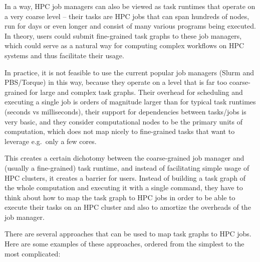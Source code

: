 In a way, HPC job managers can also be viewed as task runtimes that operate on a very coarse
level -- their tasks are HPC jobs that can span hundreds of nodes, run for days or even longer and
consist of many various programs being executed. In theory, users could submit fine-grained task
graphs to these job managers, which could serve as a natural way for computing complex workflows on
HPC systems and thus facilitate their usage.

In practice, it is not feasible to use the current popular job managers (Slurm and PBS/Torque) in
this way, because they operate on a level that is far too coarse-grained for large and complex task
graphs. Their overhead for scheduling and executing a single job is orders of magnitude larger
than for typical task runtimes (seconds vs milliseconds), their support for dependencies between
tasks/jobs is very basic, and they consider computational nodes to be the primary units of
computation, which does not map nicely to fine-grained tasks that want to leverage e.g.\ only a
few cores.

This creates a certain dichotomy between the coarse-grained job manager and (usually a
fine-grained) task runtime, and instead of facilitating simple usage of HPC clusters, it creates a
barrier for users. Instead of building a task graph of the whole computation and executing it with
a single command, they have to think about how to map the task graph to HPC jobs in order to be
able to execute their tasks on an HPC cluster and also to amortize the overheads of the job
manager.

There are several approaches that can be used to map task graphs to HPC jobs. Here are some
examples of these approaches, ordered from the simplest to the most complicated:


